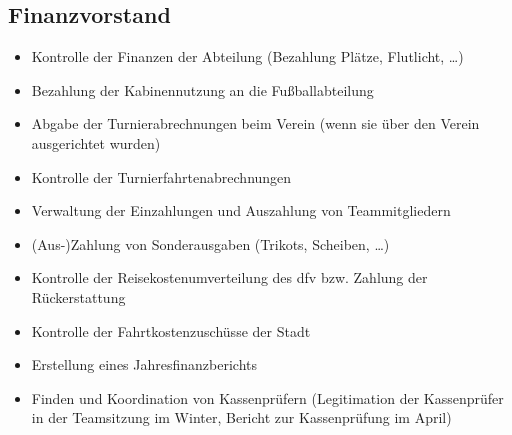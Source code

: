 \documentclass[a4 paper, 11pt]{article}
\begin{document}
\subsection{Finanzvorstand}
\begin{itemize}
	\item Kontrolle der Finanzen der Abteilung (Bezahlung Plätze, Flutlicht, \dots)
	\item Bezahlung der Kabinennutzung an die Fußballabteilung
	\item Abgabe der Turnierabrechnungen beim Verein (wenn sie über den Verein ausgerichtet wurden)
	\item Kontrolle der Turnierfahrtenabrechnungen
	\item Verwaltung der Einzahlungen und Auszahlung von Teammitgliedern
	\item (Aus-)Zahlung von Sonderausgaben (Trikots, Scheiben, \dots)
	\item Kontrolle der Reisekostenumverteilung des dfv bzw. Zahlung der Rückerstattung
	\item Kontrolle der Fahrtkostenzuschüsse der Stadt
	\item Erstellung eines Jahresfinanzberichts
	\item Finden und Koordination von Kassenprüfern (Legitimation der Kassenprüfer in der Teamsitzung im Winter, Bericht zur Kassenprüfung im April)
\end{itemize}
\end{document}
